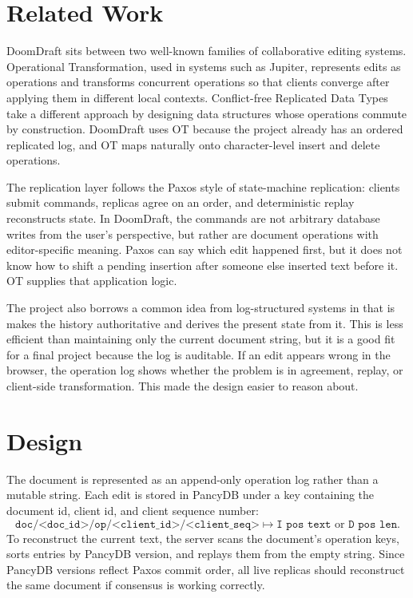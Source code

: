 \documentclass[11pt]{article}
\newcommand{\code}[1]{\texttt{#1}}
\begin{document}
\section{Related Work}

DoomDraft sits between two well-known families of collaborative editing systems. Operational Transformation, used in systems such as Jupiter, represents edits as operations and transforms concurrent operations so that clients converge after applying them in different local contexts. Conflict-free Replicated Data Types take a different approach by designing data structures whose operations commute by construction. DoomDraft uses OT because the project already has an ordered replicated log, and OT maps naturally onto character-level insert and delete operations.

The replication layer follows the Paxos style of state-machine replication: clients submit commands, replicas agree on an order, and deterministic replay reconstructs state. In DoomDraft, the commands are not arbitrary database writes from the user's perspective, but rather are document operations with editor-specific meaning. Paxos can say which edit happened first, but it does not know how to shift a pending insertion after someone else inserted text before it. OT supplies that application logic.

The project also borrows a common idea from log-structured systems in that is makes the history authoritative and derives the present state from it. This is less efficient than maintaining only the current document string, but it is a good fit for a final project because the log is auditable. If an edit appears wrong in the browser, the operation log shows whether the problem is in agreement, replay, or client-side transformation. This made the design easier to reason about.

\section{Design}

The document is represented as an append-only operation log rather than a mutable string. Each edit is stored in PancyDB under a key containing the document id, client id, and client sequence number:
\[
\code{doc/<doc\_id>/op/<client\_id>/<client\_seq>} \mapsto \code{I pos text} \text{ or } \code{D pos len}.
\]
To reconstruct the current text, the server scans the document's operation keys, sorts entries by PancyDB version, and replays them from the empty string. Since PancyDB versions reflect Paxos commit order, all live replicas should reconstruct the same document if consensus is working correctly.
\end{document}
